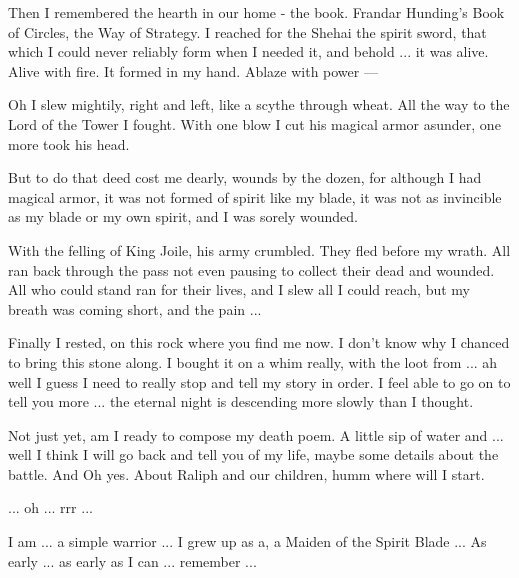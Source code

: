 Then I remembered the hearth in our home - the book. Frandar Hunding's Book of Circles, the Way of Strategy. I reached for the Shehai the spirit sword, that which I could never reliably form when I needed it, and behold ... it was alive. Alive with fire. It formed in my hand. Ablaze with power ---

Oh I slew mightily, right and left, like a scythe through wheat. All the way to the Lord of the Tower I fought. With one blow I cut his magical armor asunder, one more took his head.

But to do that deed cost me dearly, wounds by the dozen, for although I had magical armor, it was not formed of spirit like my blade, it was not as invincible as my blade or my own spirit, and I was sorely wounded.

With the felling of King Joile, his army crumbled. They fled before my wrath. All ran back through the pass not even pausing to collect their dead and wounded. All who could stand ran for their lives, and I slew all I could reach, but my breath was coming short, and the pain ...

Finally I rested, on this rock where you find me now. I don't know why I chanced to bring this stone along. I bought it on a whim really, with the loot from ... ah well I guess I need to really stop and tell my story in order. I feel able to go on to tell you more ... the eternal night is descending more slowly than I thought.

Not just yet, am I ready to compose my death poem. A little sip of water and ... well I think I will go back and tell you of my life, maybe some details about the battle. And Oh yes. About Raliph and our children, humm where will I start.

... oh ... rrr ...

I am ... a simple warrior ... I grew up as a, a Maiden of the Spirit Blade ... As early ... as early as I can ... remember ...